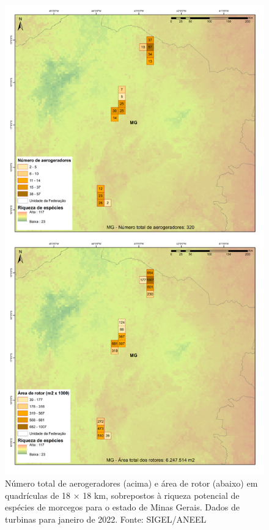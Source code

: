 \documentclass[
  oneside]{scrbook}
\begin{document}
\begin{figure}[H]

{\centering \includegraphics[width=0.7\linewidth]{imagens/cap09/Figura_9.13} 

}

\caption{Número total de aerogeradores (acima) e área de rotor (abaixo) em quadrículas de 18 × 18 km, sobrepostos à riqueza potencial de espécies de morcegos para o estado de Minas Gerais. Dados de turbinas para janeiro de 2022. Fonte: SIGEL/ANEEL}\label{fig:78}
\end{figure}
\end{document}
